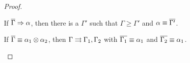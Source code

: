 \begin{proof}


\begin{lemma} \label{lem:affine-mode-4}
If $\overline{\Gamma} \Rightarrow \alpha$, then there is a $\Gamma'$ such that
$\Gamma \ge \Gamma'$ and $\alpha \equiv \overline{\Gamma'}$.
\end{lemma}


\begin{lemma} \label{lem:affine-mode-5}
If $\overline{\Gamma} \equiv \alpha_1 \otimes \alpha_2$, 
then $\Gamma \rightrightarrows \Gamma_1,\Gamma_2$ with 
$\overline{\Gamma_1} \equiv \alpha_1$ 
and $\overline{\Gamma_2} \equiv \alpha_1$.  
\end{lemma}


\end{proof}
